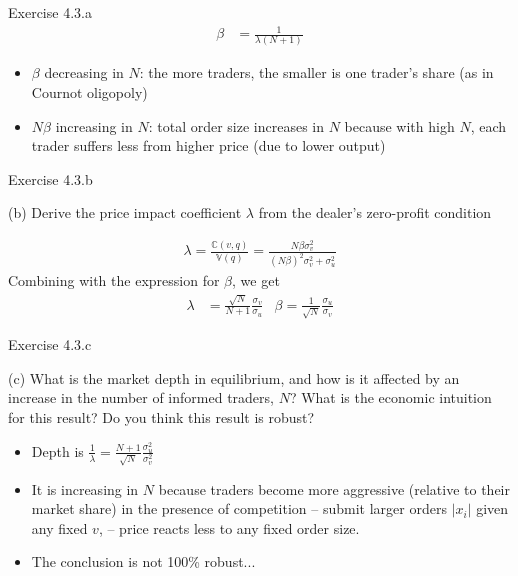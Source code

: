 \documentclass[english,10pt
,aspectratio=169
]{beamer}
\begin{document}
\begin{frame}{Exercise 4.3.a}
	\begin{align*}
	\beta &= \frac{1}{\lambda (N+1)}
	\end{align*}
	
	\begin{itemize}
		\item $\beta$ decreasing in $N$: the more traders, the smaller is one trader's share (as in Cournot oligopoly)
		\item $N \beta$ increasing in $N$: total order size increases in $N$ because with high $N$, each trader suffers less from higher price (due to lower output)
	\end{itemize}
\end{frame}


\begin{frame}{Exercise 4.3.b}
	\begin{exampleblock}{}
		(b) Derive the price impact coefficient $\lambda$ from the dealer's zero-profit condition
	\end{exampleblock}

	\pause
	
	\begin{align*}
		\lambda = \frac{\mathbb{C}(v,q)}{\mathbb{V}(q)} = \frac{N \beta \sigma^2_v}{(N \beta)^2 \sigma^2_v + \sigma^2_u}	
	\end{align*}
	Combining with the expression for $\beta$, we get
	\begin{align*}
		\lambda &= \frac{\sqrt{N}}{N+1} \frac{\sigma_v}{\sigma_u} 
		&
		\beta = \frac{1}{\sqrt{N}} \frac{\sigma_u}{\sigma_v}
	\end{align*}
\end{frame}


\begin{frame}{Exercise 4.3.c}
	\begin{exampleblock}{}
		(c) What is the market depth in equilibrium, and how is it affected by an increase in the number of informed traders, $N$? What is the economic intuition for this result?
		Do you think this result is robust?
	\end{exampleblock}
	
	\pause
	
	\begin{itemize}
		\item Depth is $\frac{1}{\lambda} = \frac{N+1}{\sqrt{N}} \frac{\sigma^2_u}{\sigma^2_v} $
		\item It is increasing in $N$ because traders become more aggressive (relative to their market share) in the presence of competition -- submit larger orders $|x_i|$ given any fixed $v$, -- price reacts less to any fixed order size.
		\item The conclusion is not 100\% robust...
	\end{itemize}
\end{frame}
\end{document}
